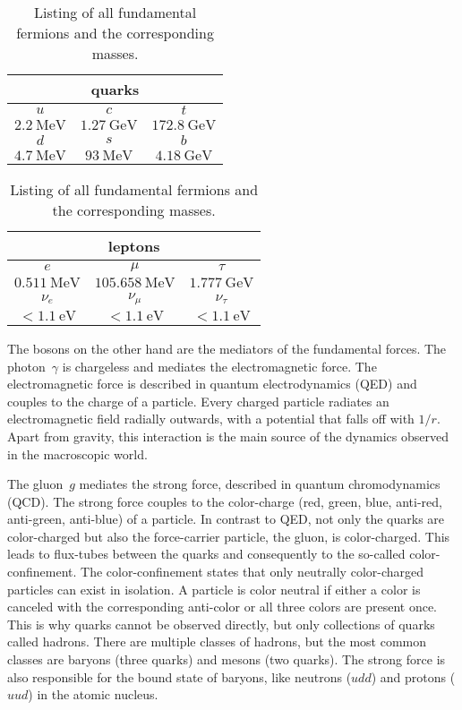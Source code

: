 \begin{table}
    \centering
    \caption{Listing of all fundamental fermions and the corresponding masses. \cite{pdg}}
    \begin{tabular}{c c c}
        \toprule
        \multicolumn{3}{c}{quarks} \\
        \midrule
        $u$ & $c$ & $t$ \\
        $\qty{2.2}{\mega\eV}$ & $\qty{1.27}{\giga\eV}$ & $\qty{172.8}{\giga\eV}$ \\
        $d$ & $s$ & $b$ \\
        $\qty{4.7}{\mega\eV}$ & $\qty{93}{\mega\eV}$ & $\qty{4.18}{\giga\eV}$ \\
        \bottomrule
    \end{tabular}
    \begin{tabular}{c c c}
        \toprule
        \multicolumn{3}{c}{leptons} \\
        \midrule
        $e$ & $\mu$ & $\tau$ \\
        $\qty{0.511}{\mega\eV}$ & $\qty{105.658}{\mega\eV}$ & $\qty{1.777}{\giga\eV}$ \\
        $\nu_e$ & $\nu_\mu$ & $\nu_\tau$ \\
        $<\qty{1.1}{\eV}$ & $<\qty{1.1}{\eV}$ & $<\qty{1.1}{\eV}$ \\
        \bottomrule
    \end{tabular}
    \label{tab:fermion_masses}
\end{table}

The bosons on the other hand are the mediators of the fundamental forces.
The photon~$\gamma$ is chargeless and mediates the electromagnetic force.
The electromagnetic force is described in quantum electrodynamics (QED) and couples to the charge of a particle.
Every charged particle radiates an electromagnetic field radially outwards, with a potential that falls off with $1/r$.
Apart from gravity, this interaction is the main source of the dynamics observed in the macroscopic world.

The gluon~$g$ mediates the strong force, described in quantum chromodynamics (QCD).
The strong force couples to the color-charge (red, green, blue, anti-red, anti-green, anti-blue) of a particle.
In contrast to QED, not only the quarks are color-charged but also the force-carrier particle, the gluon, is color-charged.
This leads to flux-tubes between the quarks and consequently to the so-called color-confinement.
The color-confinement states that only neutrally color-charged particles can exist in isolation.
A particle is color neutral if either a color is canceled with the corresponding anti-color or all three colors are present once.
This is why quarks cannot be observed directly, but only collections of quarks called hadrons.
There are multiple classes of hadrons, but the most common classes are baryons (three quarks) and mesons (two quarks).
The strong force is also responsible for the bound state of baryons, like neutrons ($udd$) and protons ($uud$) in the atomic nucleus.

